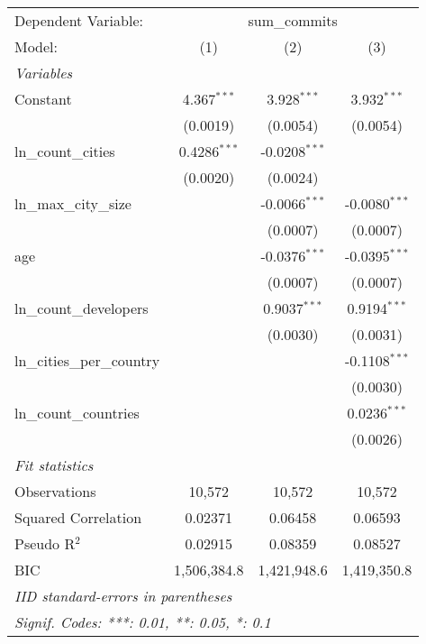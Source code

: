 \begingroup
\centering
\begin{tabular}{lccc}
   \tabularnewline \midrule \midrule
   Dependent Variable: & \multicolumn{3}{c}{sum\_commits}\\
   Model:                      & (1)            & (2)             & (3)\\  
   \midrule
   \emph{Variables}\\
   Constant                    & 4.367$^{***}$  & 3.928$^{***}$   & 3.932$^{***}$\\   
                               & (0.0019)       & (0.0054)        & (0.0054)\\   
   ln\_count\_cities           & 0.4286$^{***}$ & -0.0208$^{***}$ &   \\   
                               & (0.0020)       & (0.0024)        &   \\   
   ln\_max\_city\_size         &                & -0.0066$^{***}$ & -0.0080$^{***}$\\   
                               &                & (0.0007)        & (0.0007)\\   
   age                         &                & -0.0376$^{***}$ & -0.0395$^{***}$\\   
                               &                & (0.0007)        & (0.0007)\\   
   ln\_count\_developers       &                & 0.9037$^{***}$  & 0.9194$^{***}$\\   
                               &                & (0.0030)        & (0.0031)\\   
   ln\_cities\_per\_country    &                &                 & -0.1108$^{***}$\\   
                               &                &                 & (0.0030)\\   
   ln\_count\_countries        &                &                 & 0.0236$^{***}$\\   
                               &                &                 & (0.0026)\\   
   \midrule
   \emph{Fit statistics}\\
   Observations                & 10,572         & 10,572          & 10,572\\  
   Squared Correlation         & 0.02371        & 0.06458         & 0.06593\\  
   Pseudo R$^2$                & 0.02915        & 0.08359         & 0.08527\\  
   BIC                         & 1,506,384.8    & 1,421,948.6     & 1,419,350.8\\  
   \midrule \midrule
   \multicolumn{4}{l}{\emph{IID standard-errors in parentheses}}\\
   \multicolumn{4}{l}{\emph{Signif. Codes: ***: 0.01, **: 0.05, *: 0.1}}\\
\end{tabular}
\par\endgroup


